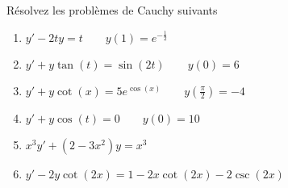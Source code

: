 
\begin{exercice}\label{exoEqsDiff0004}

Résolvez les problèmes de Cauchy suivants
\begin{enumerate}
\item $ y' - 2ty = t \qquad y(1) = e^{- \frac{1}{2}} $
\item $ y' + y \tan(t) = \sin(2t) \qquad y(0) = 6 $
\item $ y' + y \cot(x) = 5 e^{\cos(x)} \qquad y(\frac{\pi}{2}) = -4$
\item $ y' + y \cos(t) = 0 \qquad y(0) = 10 $
\item $ x^3 y' + (2 - 3x^2)y = x^3 $
\item $  y' - 2 y \cot(2x) = 1 - 2 x \cot(2x) - 2 \csc(2x) $
\end{enumerate}

\end{exercice}
